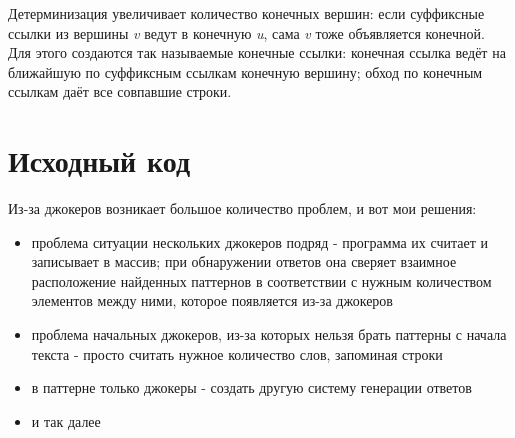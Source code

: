 Детерминизация увеличивает количество конечных вершин: если суффиксные ссылки из вершины \textit{v} ведут в конечную \textit{u}, сама \textit{v} тоже объявляется конечной. Для этого создаются так называемые конечные ссылки: конечная ссылка ведёт на ближайшую по суффиксным ссылкам конечную вершину; обход по конечным ссылкам даёт все совпавшие строки.

\pagebreak

\section{Исходный код}

Из-за джокеров возникает большое количество проблем, и вот мои решения:
\begin{itemize}
    \item проблема ситуации нескольких джокеров подряд - программа их считает и записывает в массив; при обнаружении ответов она сверяет взаимное расположение найденных паттернов в соответствии с нужным количеством элементов между ними, которое появляется из-за джокеров
    \item проблема начальных джокеров, из-за которых нельзя брать паттерны с начала текста - просто считать нужное количество слов, запоминая строки
    \item в паттерне только джокеры - создать другую систему генерации ответов
    \item и так далее
\end{itemize}


